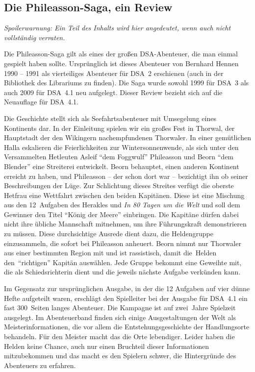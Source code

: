 \documentclass[final]{multiversum}
\begin{document}
\makemultititle
%

\subsection{Die Phileasson-Saga, ein Review}
\emph{Spoilerwarnung: Ein Teil des Inhalts wird hier
angedeutet, wenn auch nicht vollständig verraten.}

Die Phileasson-Saga gilt als eines der großen DSA-Abenteuer, die man einmal
gespielt haben sollte. Ursprünglich ist dieses Abenteuer von Bernhard Hennen
1990 -- 1991 als vierteiliges Abenteuer für DSA~2 erschienen (auch in der
Bibliothek des Librariums zu finden). Die Saga wurde sowohl 1999 für DSA~3
als auch 2009 für DSA~4.1 neu aufgelegt. Dieser Review bezieht sich auf die
Neuauflage für DSA~4.1.

Die Geschichte stellt sich als Seefahrtsabenteuer mit Umsegelung eines
Kontinents dar. In der Einleitung spielen wir ein großes Fest in Thorwal, der
Hauptstadt der den Wikingern nachempfundenen Thorwaler. In einer gemütlichen
Halla eskalieren die Feierlichkeiten zur Wintersonnenwende, als sich unter den
Versammelten Hetleuten Asleif \enquote{dem Foggwulf} Phileasson und Beorn
\enquote{dem Blender} eine Streiterei entwickelt. Beorn behauptet, einen anderen
Kontinent erreicht zu haben, und Phileasson -- der schon dort war -- bezichtigt
ihn ob seiner Beschreibungen der Lüge. Zur Schlichtung dieses Streites verfügt
die oberste Hetfrau eine Wettfahrt zwischen den beiden Kapitänen. Diese ist eine
Mischung aus den 12~Aufgaben des Herakles und \emph{In 80 Tagen um die Welt} und
soll dem Gewinner den Titel \enquote{König der Meere} einbringen. Die Kapitäne
dürfen dabei nicht ihre übliche Mannschaft mitnehmen, um ihre Führungskraft
demonstrieren zu müssen. Diese durchsichtige Ausrede dient dazu, die
Heldengruppe einzusammeln, die sofort bei Phileasson anheuert. Beorn nimmt nur
Thorwaler aus einer bestimmten Region mit und ist rassistisch, damit die~Helden
den~\enquote{richtigen} Kapitän auswählen. Jede Gruppe bekommt eine Geweihte
mit, die als Schiedsrichterin dient und die jeweils nächste Aufgabe verkünden
kann.

Im Gegensatz zur ursprünglichen Ausgabe, in der die 12 Aufgaben auf vier dünne
Hefte aufgeteilt waren, erschlägt den Spielleiter bei der Ausgabe für DSA~4.1
ein fast 300~Seiten langes Abenteuer. Die Kampagne ist auf zwei~Jahre Spielzeit
ausgelegt. Im Abenteuerband finden sich einige Ausgestaltungen der Welt als
Meisterinformationen, die vor allem die Entstehungsgeschichte der Handlungsorte
behandeln. Für den Meister macht das die Orte lebendiger. Leider haben die
Helden keine Chance, auch nur einen Bruchteil dieser Informationen mitzubekommen
und das macht es den Spielern schwer, die Hintergründe des Abenteuers zu
erfahren. 
\end{document}
